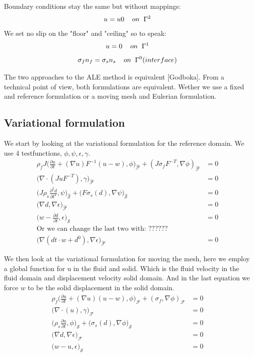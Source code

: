 Boundary conditions stay the same but without mappings:
$$ u = u0 \hspace{4mm}on \hspace{2mm} \Gamma^2$$
We set no slip on the "floor" and "ceiling" so to speak:
$$ u = 0  \hspace{4mm}on \hspace{2mm} \Gamma^1  $$
$$  \sigma_f n_f = \sigma_s n_s \hspace{4mm} on  \hspace{2mm}\Gamma^0 (interface)   $$

The two approaches to the ALE method is equivalent [Godboka]. 
From a technical point of view, both formulations are equivalent. Wether we use a fixed and reference formulation or a moving mesh and Eulerian formulation. 
\subsection*{Variational formulation}
We start by looking at the variational formulation for the reference domain.
We use 4 testfunctions, $\phi, \psi, \epsilon, \gamma$.
\begin{align*}
\rho_f J \big( \frac{\partial u}{\partial t} + (\nabla u)F^{-1}(u-w) , \phi\big)_{\mathcal{\hat{F}}} + (J\sigma_f F^{-T},\nabla \phi )_{\mathcal{\hat{F}}} &= 0  \\
 \big( \nabla \cdot (J u F^{-T}),\gamma \big)_{\mathcal{\hat{F}}} &= 0 \\
\big(J\rho_s \frac{\partial^2 d}{\partial t^2},\psi \big)_{\mathcal{\hat{S}}} + \big(F \sigma_s(d), \nabla \psi \big)_{\mathcal{\hat{S}}} &=0 \\
 \big( \nabla d , \nabla \epsilon \big)_{\mathcal{\hat{F}}} &= 0 \\
 \big( w- \frac{\partial d}{\partial t} ,\epsilon \big)_{\mathcal{\hat{S}}} &= 0 \\
 \text{Or we can change the last two with:  ??????} & \\ 
 \big( \nabla (dt\cdot w + d^0) , \nabla \epsilon \big)_{\mathcal{\hat{F}}} &= 0 
\end{align*}

We then look at the variational formulation for moving the mesh, here we employ a global function for u in the fluid and solid. Which is the fluid velocity in the fluid domain and displacement velocity solid domain. And in the last equation we force $w$ to be the solid displacement in the solid domain.
\begin{align*}
\rho_f \big( \frac{\partial u}{\partial t} + (\nabla u)(u-w) , \phi\big)_{\mathcal{F}} + (\sigma_f ,\nabla \phi )_{\mathcal{F}} &= 0  \\
 \big( \nabla \cdot (u ),\gamma \big)_{\mathcal{F}} &= 0 \\
\big(\rho_s \frac{\partial u}{\partial t},\phi \big)_{\mathcal{S}} + \big( \sigma_s(d), \nabla \phi \big)_{\mathcal{S}} &=0 \\
 \big( \nabla d , \nabla \epsilon \big)_{\mathcal{F}} &= 0 \\
 \big( w- u,\epsilon \big)_{\mathcal{S}} &= 0 \\
\end{align*}


